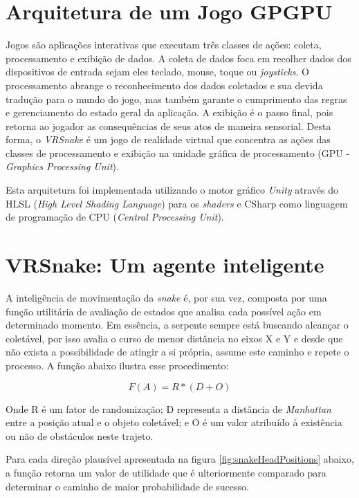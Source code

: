 \documentclass[conference]{IEEEtran}
\begin{document}
\section{Arquitetura de um Jogo GPGPU}
Jogos são aplicações interativas que executam três classes de ações: coleta, processamento e exibição de dados. %
A coleta de dados foca em recolher dados dos dispositivos de entrada sejam eles teclado, mouse, toque ou \textit{joysticks}. O processamento abrange o reconhecimento dos dados coletados e sua devida tradução para o mundo do jogo, mas também garante o cumprimento das regras e gerenciamento do estado geral da aplicação. A exibição é o passo final, pois retorna ao jogador as consequências de seus atos de maneira sensorial. Desta forma, o \textit{VRSnake} é um jogo de realidade virtual que concentra as ações das classes de processamento e exibição na unidade gráfica de processamento (GPU - \textit{Graphics Processing Unit}). 

Esta arquitetura foi implementada utilizando o motor gráfico \textit{Unity} através do HLSL (\textit{High Level Shading Language}) para os \textit{shaders} e CSharp como linguagem de programação de CPU (\textit{Central Processing Unit}).


\section{VRSnake: Um agente inteligente}

A inteligência de movimentação da \textit{snake} é, por sua vez, composta por uma função utilitária de avaliação de estados que analisa cada possível ação em determinado momento. Em essência, a serpente sempre está buscando alcançar o coletável, por isso avalia o curso de menor distância no eixos X e Y e desde que não exista a possibilidade de atingir a si própria, assume este caminho e repete o processo. A função abaixo ilustra esse procedimento:

\begin{equation}
F(A) = R * (D + O)
\label{equation11}
\end{equation}

Onde R é um fator de randomização; D representa a distância de \textit{Manhattan} entre a posição atual e o objeto coletável; e O é um valor atribuído à existência ou não de obstáculos neste trajeto.

Para cada direção plausível apresentada na figura \ref{fig:snakeHeadPositions} abaixo, a função retorna um valor de utilidade que é ulteriormente comparado para determinar o caminho de maior probabilidade de sucesso.
\end{document}
